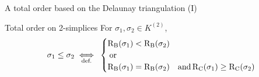 \begin{frame}[c]{A total order based on the Delaunay triangulation (I)}
	\scriptsize
	\begin{block}{\scriptsize Total order on 2-simplices}
		For $\sigma_1, \sigma_2 \in K^{(2)}$,
		\[
		\sigma_1 \leq \sigma_2 \underset{\text{def.}}{\iff} \:
		\begin{cases}
			\operatorname{R_B}(\sigma_1) < \operatorname{R_B}(\sigma_2) &\\
			\:  \operatorname{or} &\\
			\operatorname{R_B}(\sigma_1) = \operatorname{R_B}(\sigma_2) & \operatorname{and} \operatorname{R_C}(\sigma_1) \geq \operatorname{R_C}(\sigma_2)
		\end{cases}
		\]
	\end{block}
	
	\vspace{0.5cm}
		

\end{frame}
